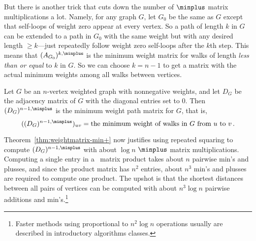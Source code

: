 But there is another trick that cuts down the number of $\minplus$
matrix multiplications a lot.  Namely, for any graph $G$, let $G_0$ be
the same as $G$ except that self-loops of weight zero appear at every
vertex.  So a path of length $k$ in $G$ can be extended to a path in
$G_0$ with the same weight but with any desired length $\geq k$---just
repeatedly follow weight zero self-loops after the $k$th step.  This
means that $(A_{G_0})^{k, \minplus}$ is the minimum weight matrix for
walks of length \emph{less than or equal} to $k$ in $G$.  So we can
choose $k = n-1$ to get a matrix with the actual minimum weights among
all walks between vertices.

\begin{theorem}\label{thm:minweightmatrix}
Let $G$ be an $n$-vertex weighted graph with nonnegative weights, and let
$D_G$ be the adjacency matrix of $G$ with the diagonal entries set to 0.
Then $(D_G)^{n-1, \minplus}$ is the minimum weight path matrix for $G$, that
is,
\[
((D_G)^{n-1, \minplus})_{uv} = \text{the minimum weight of walks in $G$ from
 $u$ to $v$}\,.
\]
\end{theorem}
Theorem~\ref{thm:weightmatrix-min+} now justifies using repeated
squaring to compute $(D_G)^{n-1, \minplus}$ with about $\log n$
$\minplus$ matrix multiplications.  Computing a single entry in a
\minplus\ matrix product takes about $n$ pairwise min's and plusses,
and since the product matrix has $n^2$ entries, about $n^3$ min's and
plusses are required to compute one product.  The upshot is that the
shortest distances between all pairs of vertices can be computed with
about $n^3\log n$ pairwise additions and min's.\footnote{Faster
  methods using proportional to $n^2\log n$ operations usually are
  described in introductory algorithms classes.}


